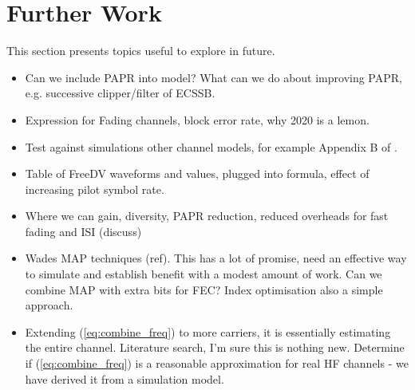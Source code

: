 \documentclass{article}
\begin{document}
\section{Further Work}

This section presents topics useful to explore in future.

\begin{itemize}
\item Can we include PAPR into model?  What can we do about improving PAPR, e.g. successive clipper/filter of ECSSB.
\item Expression for Fading channels, block error rate, why 2020 is a lemon.
\item Test against simulations other channel models, for example Appendix B of \cite{etsi201}.
\item Table of FreeDV waveforms and values, plugged into formula, effect of increasing pilot symbol rate.
\item Where we can gain, diversity, PAPR reduction, reduced overheads for fast fading and ISI (discuss)
\item Wades MAP techniques (ref).  This has a lot of promise, need an effective way to simulate and establish benefit with a modest amount of work.  Can we combine MAP with extra bits for FEC?  Index optimisation also a simple approach.
\item Extending (\ref{eq:combine_freq}) to more carriers, it is essentially estimating the entire channel.  Literature search, I'm sure this is nothing new.  Determine if (\ref{eq:combine_freq}) is a reasonable approximation for real HF channels - we have derived it from a simulation model.
\end{itemize} 

\nocite{*}


\end{document}
